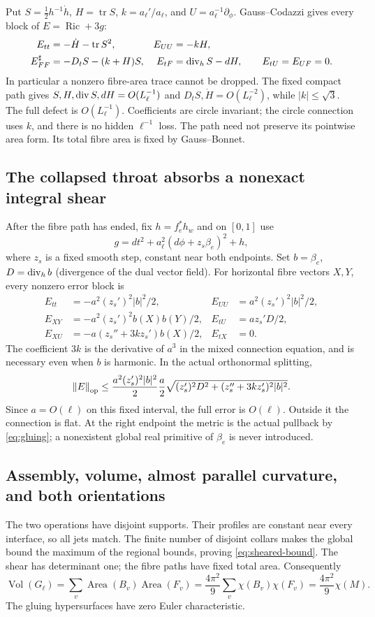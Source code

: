 \documentclass[a4paper,11pt]{article}
\theoremstyle{definition}
\DeclareMathOperator{\Ric}{Ric}\DeclareMathOperator{\Rm}{Rm}
\DeclareMathOperator{\Vol}{Vol}\DeclareMathOperator{\tr}{tr}
\newcommand{\norm}[1]{\left\lVert#1\right\rVert}
\begin{document}
Put $S=\frac12h^{-1}\dot h$, $H=\tr S$, $k=a_\ell'/a_\ell$,
and $U=a_\ell^{-1}\partial_\phi$. Gauss--Codazzi gives every block of
$E=\Ric+3g$:
\begin{align}
E_{tt}&=-\dot H-\tr S^2,& E_{UU}&=-kH,\label{eq:path-Ricci}\\
E_{FF}^{\sharp}&=-D_tS-(k+H)S,&
E_{tF}&=\Div_h S-dH,\qquad E_{tU}=E_{UF}=0.\nonumber
\end{align}
In particular a nonzero fibre-area trace cannot be dropped.
The fixed compact path gives
$S,H,\operatorname{div} S,dH=O(L_\ell^{-1})$ and
$D_tS,\dot H=O(L_\ell^{-2})$, while $|k|\le\sqrt3$.
The full defect is $O(L_\ell^{-1})$. Coefficients are circle invariant;
the circle connection uses $k$, and there is no hidden $\ell^{-1}$ loss.
The path need not preserve its pointwise area form. Its total fibre
area is fixed by Gauss--Bonnet.

\subsection{The collapsed throat absorbs a nonexact integral shear}
\label{sec:shear-blocks}
After the fibre path has ended, fix $h=f_e^*h_w$ and on $[0,1]$ use
\[
g=dt^2+a_\ell^2(d\phi+z_s\beta_e)^2+h,
\]
where $z_s$ is a fixed smooth step, constant near both endpoints.
Set $b=\beta_e$, $D=\operatorname{div}_hb$ (divergence of the dual vector field).
For horizontal fibre vectors $X,Y$, every nonzero error block is
\begin{align}
E_{tt}&=-a^2(z_s')^2|b|^2/2,&
E_{UU}&=a^2(z_s')^2|b|^2/2,\label{eq:shear-Ricci}\\
E_{XY}&=-a^2(z_s')^2b(X)b(Y)/2,&
E_{tU}&=az_s'D/2,\nonumber\\
E_{XU}&=-a(z_s''+3kz_s')b(X)/2,&E_{tX}&=0.\nonumber
\end{align}
The coefficient $3k$ is the derivative of $a^3$ in the mixed
connection equation, and is necessary even when $b$ is harmonic.
In the actual orthonormal splitting,
\[
\norm E_\op\le
\frac{a^2(z_s')^2|b|^2}{2}
\frac a2\sqrt{(z_s')^2D^2+(z_s''+3kz_s')^2|b|^2}.
\]
Since $a=O(\ell)$ on this fixed interval, the full error is $O(\ell)$.
Outside it the connection is flat. At the right endpoint the metric is
the actual pullback by \eqref{eq:gluing}; a nonexistent global real
primitive of $\beta_e$ is never introduced.

\subsection{Assembly, volume, almost parallel curvature, and both orientations}
\label{sec:assembly}
The two operations have disjoint supports. Their profiles are constant
near every interface, so all jets match. The finite number of disjoint
collars makes the global bound the maximum of the regional bounds,
proving \eqref{eq:sheared-bound}. The shear has determinant one;
the fibre paths have fixed total area. Consequently
\[
\Vol(G_\ell)=\sum_v\operatorname{Area}(B_v)\operatorname{Area}(F_v)
=\frac{4\pi^2}{9}\sum_v\chi(B_v)\chi(F_v)
=\frac{4\pi^2}{9}\chi(M).
\]
The gluing hypersurfaces have zero Euler characteristic.
\end{document}
